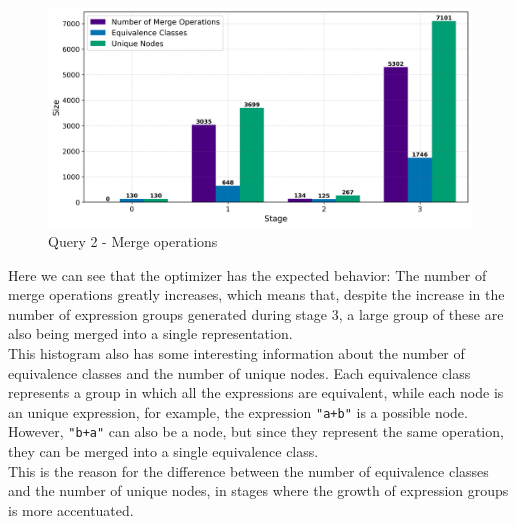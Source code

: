 \documentclass[a4paper,12pt]{scrreprt}
\begin{document}
\begin{figure}[H]
    \centering
    \includegraphics[width=\linewidth]{img_merges/q2_sizes.png}
    \caption{Query 2 - Merge operations}
    \label{fig:hist2}
\end{figure}

Here we can see that the optimizer has the expected behavior: The number of merge operations greatly increases, which means that, despite the increase in the number of expression groups generated during stage 3, a large group of these are also being merged into a single representation. \\

This histogram also has some interesting information about the number of equivalence classes and the number of unique nodes. Each equivalence class represents a group in which all the expressions are equivalent, while each node is an unique expression, for example, the expression \texttt{"a+b"} is a possible node.\\ 
However, \texttt{"b+a"} can also be a node, but since they represent the same operation, they can be merged into a single equivalence class. \\
This is the reason for the difference between the number of equivalence classes and the number of unique nodes, in stages where the growth of expression groups is more accentuated. \\
\end{document}
